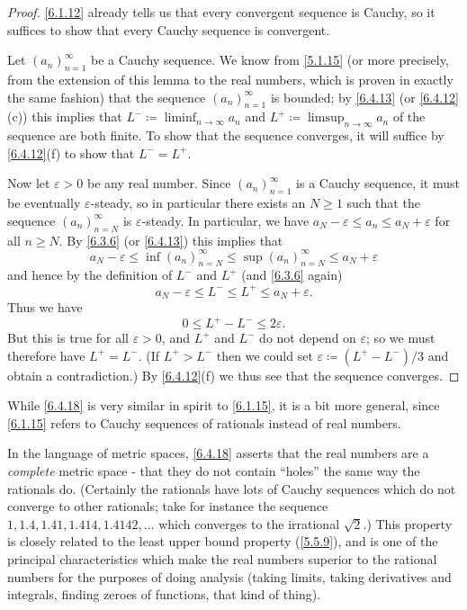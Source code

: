 \begin{proof}
  \cref{6.1.12} already tells us that every convergent sequence is Cauchy, so it suffices to show that every Cauchy sequence is convergent.

  Let \((a_n)_{n = 1}^\infty\) be a Cauchy sequence.
  We know from \cref{5.1.15} (or more precisely, from the extension of this lemma to the real numbers, which is proven in exactly the same fashion) that the sequence \((a_n)_{n = 1}^\infty\) is bounded;
  by \cref{6.4.13} (or \cref{6.4.12}(c)) this implies that \(L^- \coloneqq \liminf_{n \to \infty} a_n\) and \(L^+ \coloneqq \limsup_{n \to \infty} a_n\) of the sequence are both finite.
  To show that the sequence converges, it will suffice by \cref{6.4.12}(f) to show that \(L^- = L^+\).

  Now let \(\varepsilon > 0\) be any real number.
  Since \((a_n)_{n = 1}^\infty\) is a Cauchy sequence, it must be eventually \(\varepsilon\)-steady, so in particular there exists an \(N \geq 1\) such that the sequence \((a_n)_{n = N}^\infty\) is \(\varepsilon\)-steady.
  In particular, we have \(a_N - \varepsilon \leq a_n \leq a_N + \varepsilon\) for all \(n \geq N\).
  By \cref{6.3.6} (or \cref{6.4.13}) this implies that
  \[
    a_N - \varepsilon \leq \inf(a_n)_{n = N}^\infty \leq \sup(a_n)_{n = N}^\infty \leq a_N + \varepsilon
  \]
  and hence by the definition of \(L^-\) and \(L^+\) (and \cref{6.3.6} again)
  \[
    a_N - \varepsilon \leq L^- \leq L^+ \leq a_N + \varepsilon.
  \]
  Thus we have
  \[
    0 \leq L^+ - L^- \leq 2\varepsilon.
  \]
  But this is true for all \(\varepsilon > 0\), and \(L^+\) and \(L^-\) do not depend on \(\varepsilon\);
  so we must therefore have \(L^+ = L^-\).
  (If \(L^+ > L^-\) then we could set \(\varepsilon \coloneqq (L^+ - L^-) / 3\) and obtain a contradiction.)
  By \cref{6.4.12}(f) we thus see that the sequence converges.
\end{proof}

\begin{rmk}\label{6.4.19}
  While \cref{6.4.18} is very similar in spirit to \cref{6.1.15}, it is a bit more general, since \cref{6.1.15} refers to Cauchy sequences of rationals instead of real numbers.
\end{rmk}

\begin{rmk}\label{6.4.20}
  In the language of metric spaces, \cref{6.4.18} asserts that the real numbers are a \emph{complete} metric space
  - that they do not contain ``holes'' the same way the rationals do.
  (Certainly the rationals have lots of Cauchy sequences which do not converge to other rationals;
  take for instance the sequence \(1, 1.4, 1.41, 1.414, 1.4142, \dots\) which converges to the irrational \(\sqrt{2}\).)
  This property is closely related to the least upper bound property (\cref{5.5.9}), and is one of the principal characteristics which make the real numbers superior to the rational numbers for the purposes of doing analysis
  (taking limits, taking derivatives and integrals, finding zeroes of functions, that kind of thing).
\end{rmk}

